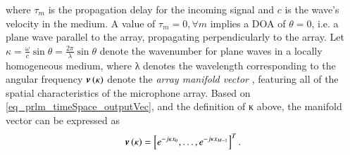 where $\tau_{m}$ is the propagation delay for the incoming signal and $c$ is the wave's velocity in the medium.
A value of $\tau_{m}=0, \forall{m}$ implies a DOA of $\theta = 0$, i.e. a plane wave parallel to the array, propagating perpendicularly to the array.
Let $\kappa=\frac{\omega}{c}\sin{\theta}=\frac{2\pi}{\lambda}\sin{\theta}$ denote the wavenumber for plane waves in a locally homogeneous medium, where λ denotes the wavelength corresponding to the angular frequency $\boldsymbol{v}\left({\kappa}\right)$ denote the \emph{array manifold vector} \cite{van2004optimum}, featuring all of the spatial characteristics of the microphone array.
Based on \eqref{eq_prlm_timeSpace_outputVec}, and the definition of κ above, the manifold vector can be expressed as
\begin{equation}
\boldsymbol{v}\left({\kappa}\right)=\left[{e^{-j\kappa{}x_{0}},\dots,e^{-j\kappa{}x_{M-1}}}\right]^{T}.
\end{equation}